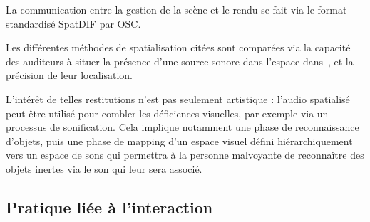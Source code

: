 \documentclass[french,12pt]{article}
\begin{document}
La communication entre la gestion de la scène et le rendu se fait via le format standardisé SpatDIF\cite{peters_spatial_2013} par OSC. %

Les différentes méthodes de spatialisation citées sont comparées via la capacité des auditeurs à situer la présence d'une source sonore dans l'espace dans~\cite{bates_comparative_2007}, et la précision de leur localisation.

L'intérêt de telles restitutions n'est pas seulement artistique : l'audio spatialisé peut être utilisé pour combler les déficiences visuelles, par exemple via un processus de sonification\cite{tang_assistive_2014}. Cela implique notamment une phase de reconnaissance d'objets, puis une phase de mapping d'un espace visuel défini hiérarchiquement vers un espace de sons qui permettra à la personne malvoyante de reconnaître des objets inertes via le son qui leur sera associé.

\subsection{Pratique liée à l'interaction}

\end{document}
